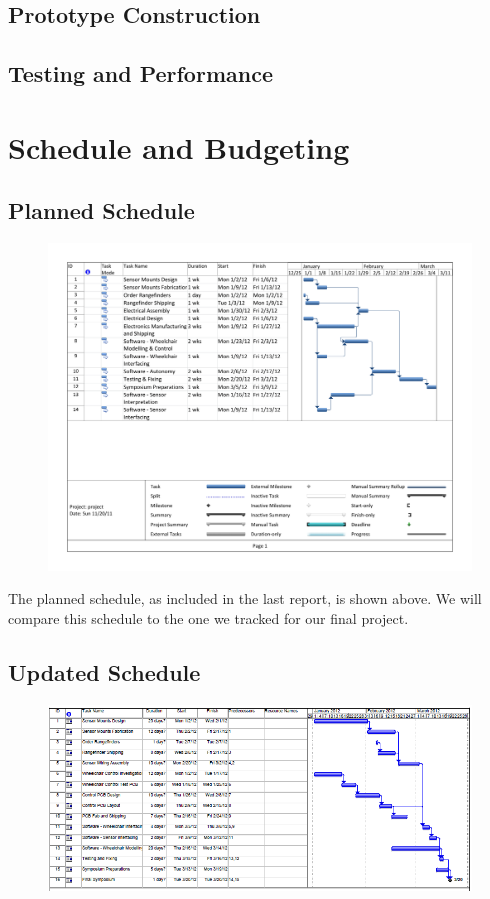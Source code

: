 \documentclass[oneside,final,a4paper]{report}
\begin{document}
\section{Prototype Construction}

\section{Testing and Performance}

\chapter{Schedule and Budgeting}

\section{Planned Schedule}
\begin{figure}
 \centering
 \includegraphics[scale=0.6]{gantt} \label{fig:gantt}
\end{figure}

The planned schedule, as included in the last report, is shown above. We will compare this schedule to the one we tracked for our final project.

\section{Updated Schedule}
\begin{figure}
 \centering
 \includegraphics[scale=0.6]{Final_Schedule} \label{fig:final_schel}
\end{figure}
\end{document}
